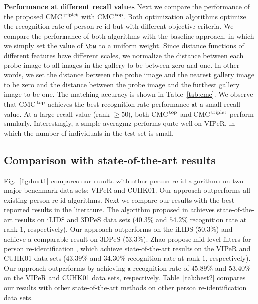 \documentclass[10pt,twocolumn,letterpaper]{article}
\def\CMCstruct{{\rm CMC$^{\,\rm top}$}\xspace}
\def\CMCtriplet{{\rm CMC$^{\,\rm triplet}$}\xspace}
\renewcommand{\paragraph}{\textbf}
\begin{document}
\paragraph{Performance at different recall values}
Next we compare the performance of the proposed \CMCtriplet
with \CMCstruct.
Both optimization algorithms optimize the recognition
rate of person re-id but with different objective criteria.
We compare the performance of both algorithms
with the baseline approach, in which we simply set the value of
$\bw$ to a uniform weight.
Since distance functions of different features have different scales,
we normalize the distance between each probe image to all images in
the gallery to be between zero and one.
In other words,
we set the distance between the probe image and
the nearest gallery image
to be zero and the distance between
the probe image and the furthest gallery
image to be one.
The matching accuracy is shown in Table~\ref{tab:cmc}.
We observe that \CMCstruct achieves the best recognition rate performance
at a small recall value.
At a large recall value (rank $\geq 50$), both \CMCstruct and \CMCtriplet
perform similarly.
Interestingly, a simple averaging performs quite well on VIPeR, in
which the number of individuals in the test set is small.


\subsection{Comparison with state-of-the-art results}

Fig.~\ref{fig:best1} compares our results with
other person re-id algorithms on two
major benchmark data sets: VIPeR and CUHK01.
Our approach outperforms all existing person re-id algorithms.
Next we compare our results with
the best reported results in the literature.
The algorithm proposed in \cite{Xiong2014Person} achieves
state-of-the-art results on iLIDS and 3DPeS
data sets ($40.3\%$ and $54.2\%$ recognition rate at rank-$1$, respectively).
Our approach outperforms \cite{Xiong2014Person} on the iLIDS
($50.3\%$) and
achieve a comparable result on 3DPeS ($53.3\%$).
Zhao \etal propose mid-level
filters for person re-identification \cite{Zhao2014Learning},
which achieve state-of-the-art results on the VIPeR and CUHK01 data sets
($43.39\%$ and $34.30\%$ recognition rate at rank-$1$, respectively).
Our approach outperforms \cite{Zhao2014Learning} by
achieving a recognition rate of $45.89\%$ and $53.40\%$ on the
VIPeR and CUHK01 data sets, respectively.
Table~\ref{tab:best2} compares our results
with other state-of-the-art methods on other person
re-identification data sets.
\end{document}
